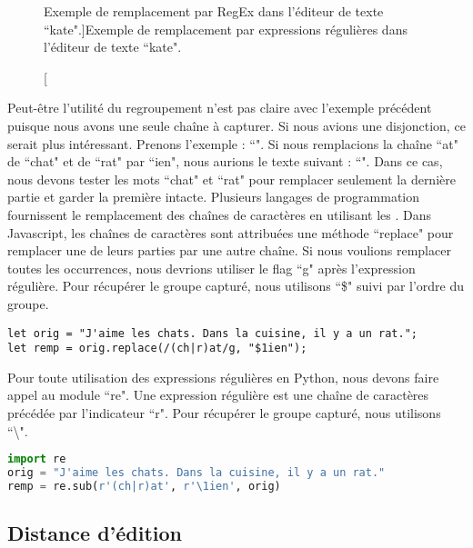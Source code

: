 \documentclass{KodeBook}
\begin{document}
\begin{figure}[ht]
	\centering
	\caption[Exemple de remplacement par RegEx dans l'éditeur de texte ``kate".]{Exemple de remplacement par expressions régulières dans l'éditeur de texte ``kate".}
	\label{fig:kate_regex}
\end{figure}


Peut-être l'utilité du regroupement n'est pas claire avec l'exemple précédent puisque nous avons une seule chaîne à capturer.
Si nous avions une disjonction, ce serait plus intéressant.
Prenons l'exemple : ``". 
Si nous remplacions la chaîne ``at" de ``chat" et de ``rat" par ``ien", nous aurions le texte suivant : 
``".
Dans ce cas, nous devons tester les mots ``chat" et ``rat" pour remplacer seulement la dernière partie et garder la première intacte.
Plusieurs langages de programmation fournissent le remplacement des chaînes de caractères en utilisant les .
Dans Javascript, les chaînes de caractères sont attribuées une méthode ``replace" pour remplacer une de leurs parties par une autre chaîne. 
Si nous voulions remplacer toutes les occurrences, nous devrions utiliser le flag ``g" après l'expression régulière.
Pour récupérer le groupe capturé, nous utilisons ``\$" suivi par l'ordre du groupe.

\begin{lstlisting}[language={[KB]Javascript}, style=codeStyle]
let orig = "J'aime les chats. Dans la cuisine, il y a un rat.";
let remp = orig.replace(/(ch|r)at/g, "$1ien");
\end{lstlisting}

Pour toute utilisation des expressions régulières en Python, nous devons faire appel au module ``re".
Une expression régulière est une chaîne de caractères précédée par l'indicateur ``r".
Pour récupérer le groupe capturé, nous utilisons ``\textbackslash".

\begin{lstlisting}[language=Python, style=codeStyle]
import re
orig = "J'aime les chats. Dans la cuisine, il y a un rat."
remp = re.sub(r'(ch|r)at', r'\1ien', orig)
\end{lstlisting}


\subsection{Distance d'édition}
\end{document}
